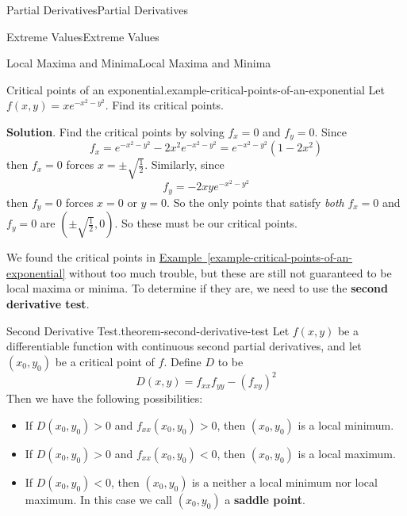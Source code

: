 \documentclass[10pt,]{book}
\newcommand{\terminology}[1]{\textbf{#1}}
\numberwithin{equation}{section}
\begin{document}
\begin{chapterptx}{Partial Derivatives}{}{Partial Derivatives}{}{}
\begin{sectionptx}{Extreme Values}{}{Extreme Values}{}{}
\begin{subsectionptx}{Local Maxima and Minima}{}{Local Maxima and Minima}{}{}
\begin{example}{Critical points of an exponential.}{example-critical-points-of-an-exponential}%
\hypertarget{p-1204}{}%
Let \(f(x,y) = xe^{-x^{2} - y^{2}}\). Find its critical points.%
\par\smallskip%
\noindent\textbf{Solution}.\hypertarget{solution-189}{}\quad%
\hypertarget{p-1205}{}%
Find the critical points by solving \(f_{x} = 0\) and \(f_{y} = 0\). Since%
\begin{equation*}
f_{x} = e^{-x^{2} - y^{2}} -2x^{2}e^{-x^{2} - y^{2}} = e^{-x^{2} - y^{2}}(1 - 2x^{2})
\end{equation*}
then \(f_{x} = 0\) forces \(x = \pm\sqrt{\frac{1}{2}}\). Similarly, since%
\begin{equation*}
f_{y} = -2xye^{-x^{2} - y^{2}}
\end{equation*}
then \(f_{y} = 0\) forces \(x = 0\) or \(y = 0\). So the only points that satisfy \emph{both} \(f_{x} = 0\) and \(f_{y} = 0\) are \((\pm\sqrt{\frac{1}{2}}, 0).\) So these must be our critical points.%
\end{example}
\hypertarget{p-1206}{}%
We found the critical points in \hyperref[example-critical-points-of-an-exponential]{Example~\ref{example-critical-points-of-an-exponential}} without too much trouble, but these are still not guaranteed to be local maxima or minima. To determine if they are, we need to use the \terminology{second derivative test}.%
\begin{theorem}{Second Derivative Test.}{}{theorem-second-derivative-test}%
\hypertarget{p-1207}{}%
Let \(f(x,y)\) be a differentiable function with continuous second partial derivatives, and let \((x_{0},y_{0})\) be a critical point of \(f\). Define \(D\) to be%
\begin{equation*}
D(x,y) = f_{xx}f_{yy} - (f_{xy})^{2}
\end{equation*}
Then we have the following possibilities: \leavevmode%
\begin{itemize}[label=\textbullet]
\item{}If \(D(x_{0},y_{0}) > 0 \) and \(f_{xx}(x_{0},y_{0}) > 0\), then \((x_{0},y_{0})\) is a local minimum.%
\item{}If \(D(x_{0},y_{0}) > 0 \) and \(f_{xx}(x_{0},y_{0}) < 0\), then \((x_{0},y_{0})\) is a local maximum.%
\item{}If \(D(x_{0},y_{0}) < 0 \), then \((x_{0},y_{0})\) is a neither a local minimum nor local maximum. In this case we call \((x_{0},y_{0})\) a \terminology{saddle point}.%

\end{itemize}
\end{theorem}
\end{subsectionptx}
\end{sectionptx}
\end{chapterptx}
\end{document}
